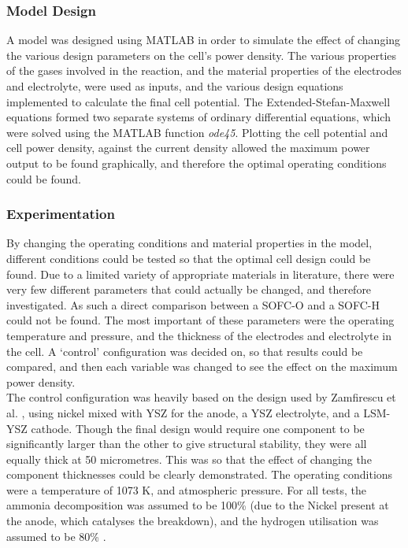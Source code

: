     \subsubsection{Model Design}
    A model was designed using MATLAB in order to simulate the effect of changing the various design parameters on the cell's power density. The various properties of the gases involved in the reaction, and the material properties of the electrodes and electrolyte, were used as inputs, and the various design equations implemented to calculate the final cell potential. The Extended-Stefan-Maxwell equations formed two separate systems of ordinary differential equations, which were solved using the MATLAB function \textit{ode45}. Plotting the cell potential and cell power density, against the current density allowed the maximum power output to be found graphically, and therefore the optimal operating conditions could be found.
    
    \subsubsection{Experimentation}
    By changing the operating conditions and material properties in the model, different conditions could be tested so that the optimal cell design could be found. Due to a limited variety of appropriate materials in literature, there were very few different parameters that could actually be changed, and therefore investigated. As such a direct comparison between a SOFC-O and a SOFC-H could not be found. The most important of these parameters were the operating temperature and pressure, and the thickness of the electrodes and electrolyte in the cell. A `control' configuration was decided on, so that results could be compared, and then each variable was changed to see the effect on the maximum power density.\\
The control configuration was heavily based on the design used by Zamfirescu et al. \cite{LM5}, using nickel mixed with YSZ for the anode, a YSZ electrolyte, and a LSM-YSZ cathode. Though the final design would require one component to be significantly larger than the other to give structural stability, they were all equally thick at 50 micrometres. This was so that the effect of changing the component thicknesses could be clearly demonstrated. The operating conditions were a temperature of 1073 K, and atmospheric pressure. For all tests, the ammonia decomposition was assumed to be 100\% (due to the Nickel present at the anode, which catalyses the breakdown), and the hydrogen utilisation was assumed to be 80\% \cite{LM20}.

